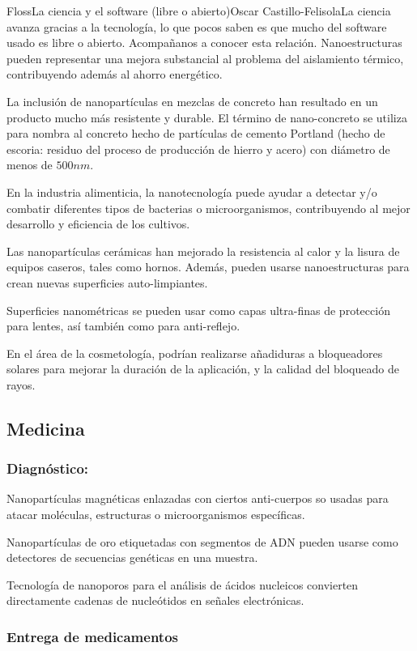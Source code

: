 \begin{article}[2]{Floss}{La ciencia y el software (libre o abierto)}{Oscar Castillo-Felisola}{La ciencia avanza gracias a la tecnolog\'ia, lo que pocos saben es que mucho del software usado es libre o abierto. Acompa\~nanos a conocer esta relaci\'on.}
Nanoestructuras pueden representar una mejora substancial al problema del aislamiento t\'ermico, contribuyendo adem\'as al ahorro energ\'etico.

La inclusi\'on de nanopart\'iculas en mezclas de concreto han resultado en un producto mucho m\'as resistente y durable. El t\'ermino de nano-concreto se utiliza para nombra al concreto hecho de part\'iculas de cemento Portland (hecho de escoria: residuo del proceso de producci\'on de hierro y acero) con di\'ametro de menos de $500 n m$.


En la industria alimenticia, la nanotecnolog\'ia puede ayudar a detectar y/o combatir diferentes tipos de bacterias o microorganismos, contribuyendo al mejor desarrollo y eficiencia de los cultivos.

Las nanopart\'iculas cer\'amicas han mejorado la resistencia al calor y la lisura de equipos caseros, tales como hornos. Adem\'as, pueden usarse nanoestructuras para crean nuevas superficies auto-limpiantes.

Superficies nanom\'etricas se pueden usar como capas ultra-finas de protecci\'on para lentes, as\'i tambi\'en como para anti-reflejo.

En el \'area de la cosmetolog\'ia, podr\'ian realizarse a\~nadiduras a bloqueadores solares para mejorar la duraci\'on de la aplicaci\'on, y la calidad del bloqueado de rayos.

\subsection{Medicina}
\subsubsection*{Diagn\'ostico:}

Nanopart\'iculas magn\'eticas enlazadas con ciertos anti-cuerpos so usadas para atacar mol\'eculas, estructuras o microorganismos  espec\'ificas.

Nanopart\'iculas de oro etiquetadas con segmentos de ADN pueden usarse como detectores de secuencias gen\'eticas en una muestra.

Tecnolog\'ia de nanoporos para el an\'alisis de \'acidos nucleicos convierten directamente cadenas de nucle\'otidos en se\~nales electr\'onicas.

\subsubsection*{Entrega de medicamentos}


\end{article}

